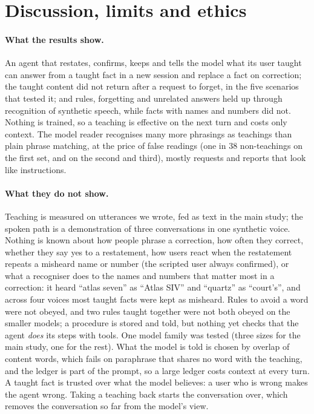 
\section{Discussion, limits and ethics}\label{sec:discussion}

\paragraph{What the results show.}
An agent that restates, confirms, keeps and tells the model what its user taught can answer from a taught fact in a new session and replace a fact on correction; the taught content did not return after a request to forget, in the five scenarios that tested it; and rules, forgetting and unrelated answers held up through recognition of synthetic speech, while facts with names and numbers did not. Nothing is trained, so a teaching is effective on the next turn and costs only context. The model reader recognises many more phrasings as teachings than plain phrase matching, at the price of false readings (one in 38 non-teachings on the first set, \ReadBModelFired{} and \ReadCModelFired{} on the second and third), mostly requests and reports that look like instructions.

\paragraph{What they do not show.}
Teaching is measured on utterances we wrote, fed as text in the main study; the spoken path is a demonstration of three conversations in one synthetic voice. Nothing is known about how people phrase a correction, how often they correct, whether they say yes to a restatement,
how users react when the restatement repeats a misheard name or number (the scripted user always confirmed), or what a recogniser does to the names and numbers that matter most in a correction: it heard ``atlas seven'' as ``Atlas SIV'' and ``quartz'' as ``court's'', and across four voices most taught facts were kept as misheard. Rules to avoid a word were not obeyed, and two rules taught together were not both obeyed on the smaller models; a procedure is stored and told, but nothing yet checks that the agent \emph{does} its steps with tools. One model family was tested (three sizes for the main study, one for the rest). What the model is told is chosen by overlap of content words, which fails on paraphrase that shares no word with the teaching, and the ledger is part of the prompt, so a
large ledger costs context at every turn. A taught fact is trusted over what the model believes: a user who is wrong makes the agent wrong. Taking a teaching back starts the conversation over, which removes the conversation so far from the model's view.

